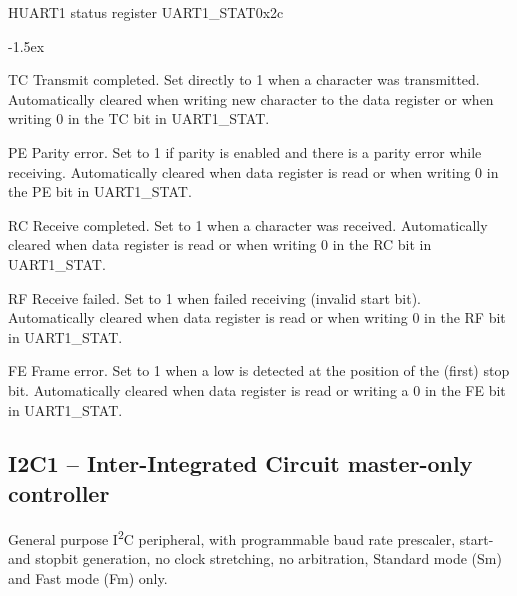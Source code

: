 \documentclass[12pt]{article}
\begin{document}
\begin{register}{H}{UART1 status register UART1\_STAT}{0x2c}
\label{uart1stat}
%
%
%
%
%
%
\regnewline%
\end{register}
\begin{regdesc}[0.8\textwidth]\begin{reglist}[0000]
\itemsep-1.5ex
\item[TC] Transmit completed. Set directly to 1 when a character was transmitted. Automatically cleared when writing new character to the data register or when writing 0 in the TC bit in \mbox{UART1\_STAT}.
\item[PE] Parity error. Set to 1 if parity is enabled and there is a parity error while receiving. Automatically cleared when data register is read or when writing 0 in the PE bit in UART1\_STAT.
\item[RC] Receive completed. Set to 1 when a character was received. Automatically cleared when data register is read or when writing 0 in the RC bit in UART1\_STAT.
\item[RF] Receive failed. Set to 1 when failed receiving (invalid start bit). Automatically cleared when data register is read or when writing 0 in the RF bit in UART1\_STAT.
\item [FE] Frame error. Set to 1 when a low is detected at the position of the (first) stop bit. Automatically cleared when data register is read or writing a 0 in the FE bit in UART1\_STAT.
\end{reglist}\end{regdesc}


\subsection{I2C1 -- Inter-Integrated Circuit master-only controller}
General purpose I\textsuperscript{2}C peripheral, with programmable baud rate prescaler, start- and stopbit generation, no clock stretching, no arbitration, Standard mode (Sm) and Fast mode (Fm) only.
\end{document}
